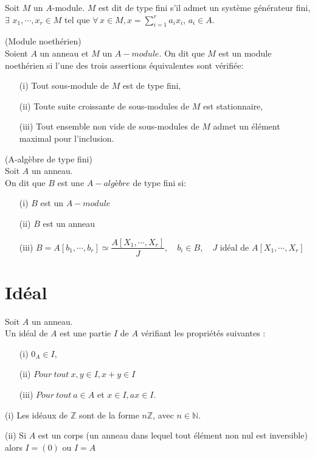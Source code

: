 \begin{madefinition}
	Soit $M$ un $A$-module. $M$ est dit de type fini s'il admet un système générateur fini, $\exists \, \, x_1, \cdots ,x_r \in M$ tel que $\forall \,  x \in M, x = \displaystyle \sum_{i=1}^{r}{a_i x_i}$, $a_i \in A$.
\end{madefinition}
\begin{maproposition}
	(Module noethérien) \\
	Soient $A$ un anneau et $M$ un $A-module$. On dit que $M$ est un module noethérien si l'une des trois assertions équivalentes sont vérifiée:
	\begin{enumerate}
		\item[(i)] Tout sous-module de $M$ est de type fini,
		\item[(ii)] Toute suite croissante de sous-modules de $M$ est stationnaire,
		\item[(iii)] Tout ensemble non vide de sous-modules de $M$ admet un élément maximal pour l'inclusion.
	\end{enumerate} 
\end{maproposition}
\begin{madefinition}(A-algèbre de type fini)\\
	Soit $A$ un anneau. \\
	On dit que $B$ est une $A-algèbre$ de type fini si:
	\begin{enumerate}
		\item[(i)] $B$ est un $A-module$
		\item[(ii)] $B$ est un anneau
		\item[(iii)] $B = A [b_1, \cdots, b_r] \simeq \dfrac{A[X_1, \cdots, X_r]}{J}, \quad b_i \in B , \quad J$ idéal de $A[X_1, \cdots, X_r]$
	\end{enumerate}
\end{madefinition}
\section{Idéal}
\begin{madefinition}
	Soit $A$ un anneau.\\
	Un idéal de $A$ est une partie $I$ de $A$ vérifiant les propriétés suivantes : \\
	\begin{enumerate}
		\item[(i)] $0_A \in I$,
		\item[(ii)] $ Pour \ tout \ x, y \in I, x+y \in I$
		\item[(iii)] $ Pour \ tout \ a \in A$ et $x \in I , ax \in I$.
	\end{enumerate}
\end{madefinition}
\begin{monexemple}
	\item[(i)] Les idéaux de $\mathbb{Z}$ sont de la forme $n\mathbb{Z}$, avec $n \in \mathbb{N}$.
	\item[(ii)] Si $A$ est un corps (un anneau dans lequel tout élément non nul est inversible) alors $I= (0) $ ou $I=A$
\end{monexemple}
